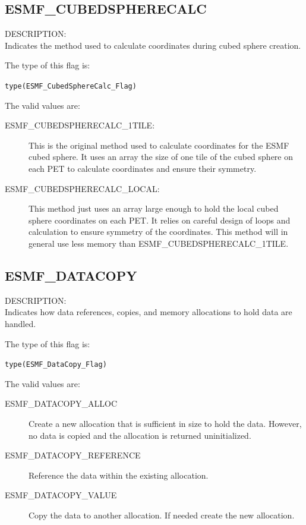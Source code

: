 \subsection{ESMF\_CUBEDSPHERECALC}
\label{const:cubedspherecalcflag}
{\sf DESCRIPTION:\\}  
Indicates the method used to calculate coordinates during cubed sphere creation. 

The type of this flag is:

{\tt type(ESMF\_CubedSphereCalc\_Flag)}

The valid values are:
\begin{description}

\item [ESMF\_CUBEDSPHERECALC\_1TILE:]
  This is the original method used to calculate coordinates for the ESMF cubed sphere. It uses
  an array the size of one tile of the cubed sphere on each PET to calculate coordinates
  and ensure their symmetry. 
\item [ESMF\_CUBEDSPHERECALC\_LOCAL:]
  This method just uses an array large enough to hold the local cubed sphere coordinates on each PET.
  It relies on careful design of loops and calculation to ensure symmetry of the coordinates. This
  method will in general use less memory than ESMF\_CUBEDSPHERECALC\_1TILE.
\end{description}


\subsection{ESMF\_DATACOPY}
\label{const:datacopyflag}
{\sf DESCRIPTION:\\}
Indicates how data references, copies, and memory allocations to hold data are
handled.

The type of this flag is:

{\tt type(ESMF\_DataCopy\_Flag)}

The valid values are:
\begin{description}
\item [ESMF\_DATACOPY\_ALLOC]
      Create a new allocation that is sufficient in size to hold the data.
      However, no data is copied and the allocation is returned uninitialized.
\item [ESMF\_DATACOPY\_REFERENCE]
      Reference the data within the existing allocation.
\item [ESMF\_DATACOPY\_VALUE]
      Copy the data to another allocation. If needed create the new allocation.
\end{description}

